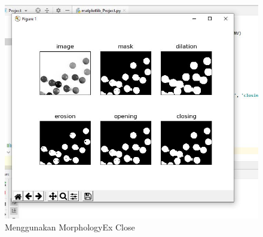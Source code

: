 \begin{figure}[ht]
\centering
\includegraphics[scale=0.6]{figures/2,56.jpg}
\caption{Menggunakan MorphologyEx Close}
\label{contoh}
\end{figure}






\newpage
